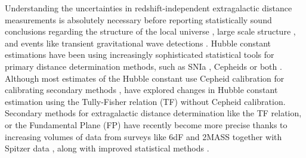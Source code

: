 \documentclass[a4paper,fleqn,usenatbib]{mnras}
\begin{document}
Understanding the uncertainties in redshift-independent extragalactic distance measurements is absolutely necessary before reporting statistically sound conclusions regarding the structure of the local universe \citep{void,locunivcf,nongauss,6df,localunipv,said,gg3500}, large scale structure \citep{anishub,gallargescale,morphanis,tecciencia,bayesh}, and events like transient gravitational wave detections \citep{gwgallist}. Hubble constant estimations have been using increasingly sophisticated statistical tools for primary distance determination methods, such as SNIa \citep{ridsn,unity,hubsn2018}, Cepheids \citet{hubngc} or both \citep{riess}. Although most estimates of the Hubble constant use Cepheid calibration for calibrating secondary methods \citep{hubunc,huborig,hub2010}, \citet{noceph} have explored changes in Hubble constant estimation using the Tully-Fisher relation (TF) without Cepheid calibration. Secondary methods for extragalactic distance determination like the TF relation, or the Fundamental Plane (FP) have recently become more precise thanks to increasing volumes of data from surveys like 6dF \citep{6df}  and  2MASS \citep{2mass,tf07dist} together with Spitzer data \citep{sorce}, along with improved statistical methods \citep{precisetf}. \\
\end{document}

